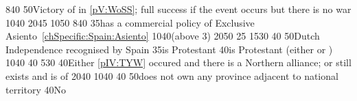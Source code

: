 %
%
{8}{40}{\EU@objMonopolyZone}%
%
%
%
{}{50}{Victory of \paysmajeurEspagne in \ref{pV:WoSS}; full success if the
  event occurs but there is no war}%
%
%
{10}{40}{\EU@objOuterProvinces}%
%
%
{20}{45}{\EU@objSpanishWorld}%
%
%
{10}{50}{\EU@objPresidiosHIS}%
%
%
{8}{40}{\EU@objMonopolyZone}%
%
%
%
{}{35}{\paysmajeurEspagne has a commercial policy of Exclusive
  Asiento~\ref{chSpecific:Spain:Asiento}}%
%
%
{10}{40}{\EU@objOuterProvinces (above 3)}%
%
%
{20}{50}{\EU@objSpanishWorld}%
%
%
{}{25}{\EU@objIndustrial}%
%
%
{15}{30}{\EU@objIndependanceWars}%
%
 
%
%
{}{40}{}%
%
%
{}{50}{Dutch Independence recognised by Spain}%
%
%
{}{35}{\paysmajeurFrance is Protestant}%
%
%
{}{40}{\paysmajeurAngleterre is Protestant (either \PROTANG or \PROTPUR)}%
%
%
{10}{40}{\EU@objEastIndiesConvoy}%
%
%
%
{}{40}{}%
%
%
{5}{30}{\EU@objBaltiqueTrade}%
%
%
{}{40}{Either \ref{pIV:TYW} occured and there is a Northern \HRE alliance; or
  \payshanse still exists and is \VASSAL of \paysmajeurHollande}%
%
%
{20}{40}{\EU@objNoActNavigation}%
%
\EUobjective{}{\continentBrazil}{\COL}%
{10}{40}{\EU@objEachCOL[\continentBrazil]}%
%
%
%
{}{40}{}%
%
%
{}{50}{\paysmajeurFrance does not own any province adjacent to
  \paysmajeurHollande national territory}%
%
%
{}{40}{No \EU@objEastMalacca}%
